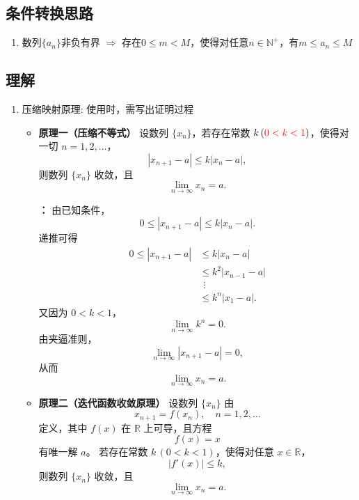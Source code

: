\documentclass[a4paper,12pt]{article}
\begin{document}
    \subsection{条件转换思路}

    \begin{enumerate}
        \item 数列$\{a_n\}$非负有界 $\Rightarrow$ 存在$0 \leq m < M$，使得对任意$n \in \mathbb{N}^+$，有$m \leq a_n \leq M$

    \end{enumerate}

    \subsection{理解}

    \begin{enumerate}
        \item 压缩映射原理: 使用时，需写出证明过程
        \begin{itemize}

            \item \textbf{原理一（压缩不等式）}
            设数列 $\{x_n\}$，若存在常数 $k\,({\color{red}{0 < k < 1}})$，使得对一切
            $n=1,2,\dots$，
            \[
                |x_{n+1}-a|\le k|x_n-a|,
            \]
            则数列 $\{x_n\}$ 收敛，且
            \[
                \lim_{n\to\infty}x_n=a.
            \]

            \textbf{{\color{red}{证}}：}
            由已知条件，
            \[
                0\le |x_{n+1}-a|\le k|x_n-a|.
            \]
            递推可得
            \[
                \begin{aligned}
                    0\le |x_{n+1}-a|
                    &\le k|x_n-a| \\
                    &\le k^2|x_{n-1}-a| \\
                    &\ \ \vdots \\
                    &\le k^n|x_1-a|.
                \end{aligned}
            \]
            又因为 $0<k<1$，
            \[
                \lim_{n\to\infty}k^n=0.
            \]
            由夹逼准则，
            \[
                \lim_{n\to\infty}|x_{n+1}-a|=0,
            \]
            从而
            \[
                \lim_{n\to\infty}x_n=a.
            \]

            \item \textbf{原理二（迭代函数收敛原理）}
            设数列 $\{x_n\}$ 由
            \[
                x_{n+1}=f(x_n), \quad n=1,2,\dots
            \]
            定义，其中 $f(x)$ 在 $\mathbb{R}$ 上可导，且方程
            \[
                f(x)=x
            \]
            有唯一解 $a$。
            若存在常数 $k\,(0<k<1)$，使得对任意 $x\in\mathbb{R}$，
            \[
                |f'(x)|\le k,
            \]
            则数列 $\{x_n\}$ 收敛，且
            \[
                \lim_{n\to\infty}x_n=a.
            \]


\end{itemize}
\end{enumerate}
\end{document}
